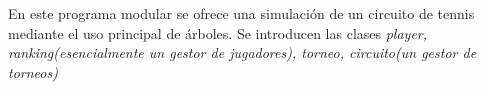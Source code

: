 En este programa modular se ofrece una simulación de un circuito de tennis mediante el uso principal de árboles. Se introducen las clases {\itshape player{\itshape , {\itshape ranking{\itshape  (esencialmente un gestor de jugadores), {\itshape torneo{\itshape , {\itshape circuito{\itshape  (un gestor de torneos) }}}}}}}}